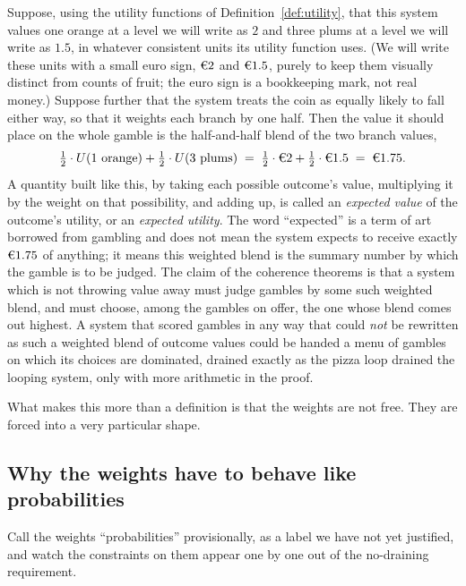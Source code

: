 \documentclass[10pt]{article}
\theoremstyle{definition}
\theoremstyle{remark}
\begin{document}
Suppose, using the utility functions of Definition~\ref{def:utility}, that this system values one orange at a level we will write as $2$ and three plums at a level we will write as $1.5$, in whatever consistent units its utility function uses. (We will write these units with a small euro sign, $\text{\texteuro}2$ and $\text{\texteuro}1.5$, purely to keep them visually distinct from counts of fruit; the euro sign is a bookkeeping mark, not real money.) Suppose further that the system treats the coin as equally likely to fall either way, so that it weights each branch by one half. Then the value it should place on the whole gamble is the half-and-half blend of the two branch values,
\[
\tfrac12 \cdot U(\text{1 orange}) + \tfrac12 \cdot U(\text{3 plums}) \;=\; \tfrac12 \cdot \text{\texteuro}2 + \tfrac12 \cdot \text{\texteuro}1.5 \;=\; \text{\texteuro}1.75 .
\]
A quantity built like this, by taking each possible outcome's value, multiplying it by the weight on that possibility, and adding up, is called an \emph{expected value} of the outcome's utility, or an \emph{expected utility}. The word ``expected'' is a term of art borrowed from gambling and does not mean the system expects to receive exactly $\text{\texteuro}1.75$ of anything; it means this weighted blend is the summary number by which the gamble is to be judged. The claim of the coherence theorems is that a system which is not throwing value away must judge gambles by some such weighted blend, and must choose, among the gambles on offer, the one whose blend comes out highest. A system that scored gambles in any way that could \emph{not} be rewritten as such a weighted blend of outcome values could be handed a menu of gambles on which its choices are dominated, drained exactly as the pizza loop drained the looping system, only with more arithmetic in the proof.

What makes this more than a definition is that the weights are not free. They are forced into a very particular shape.

\subsection{Why the weights have to behave like probabilities}

Call the weights ``probabilities'' provisionally, as a label we have not yet justified, and watch the constraints on them appear one by one out of the no-draining requirement.
\end{document}
